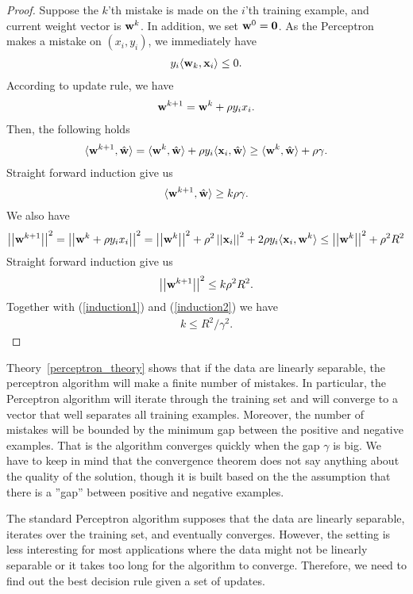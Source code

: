 \begin{proof}
	Suppose the $k$'th mistake is made on the $i$'th training example, and current weight vector is $\mathbf {w}^k$.
	In addition, we set $\mathbf {w}^0=\mathbf {0}$.
	As the Perceptron makes a mistake on $(x_i,y_i)$, we immediately have
	\begin{align*}
		y_i\langle \mathbf {w}_k, \mathbf {x}_i \rangle \le 0.
	\end{align*}
	According to update rule, we have
	\begin{align*}
		\mathbf {w}^{k+1} = \mathbf {w}^{k} + \rho y_ix_i.
	\end{align*}
	Then, the following holds
	\begin{align*}
		\langle \mathbf {w}^{k+1}, \hat{\mathbf {w}} \rangle = \langle \mathbf {w}^k, \hat{\mathbf {w}} \rangle + \rho y_i\langle \mathbf {x}_i, \hat{\mathbf {w}} \rangle \ge \langle \mathbf {w}^k, \hat{\mathbf {w}} \rangle + \rho\gamma.
	\end{align*}
	Straight forward induction give us
	\begin{align}
		\langle \mathbf {w}^{k+1}, \hat{\mathbf {w}} \rangle\ge k\rho\gamma. \label{induction1}
	\end{align}
	We also have
	\begin{align*}
		\left|\left| \mathbf {w}^{k+1} \right|\right|^2 
		= \left|\left| \mathbf {w}^{k} + \rho y_ix_i \right|\right|^2
		= \left|\left| \mathbf {w}^k \right|\right|^2 + \rho^2\left|\left| \mathbf {x}_i \right|\right|^2 + 2\rho y_i\langle \mathbf {x}_i, \mathbf {w}^k \rangle
		\le \left|\left| \mathbf {w}^k \right|\right|^2 + \rho^2R^2
	\end{align*}
	Straight forward induction give us
	\begin{align}
		\left|\left| \mathbf {w}^{k+1} \right|\right|^2\le k\rho^2R^2. \label{induction2}
	\end{align}
	Together with (\ref{induction1}) and (\ref{induction2}) we have
	\begin{align*}
		k\le{R^2}/{\gamma^2}.
	\end{align*}
\end{proof}
Theory~\ref{perceptron_theory} shows that if the data are linearly separable, the perceptron algorithm will make a finite number of mistakes. 
In particular, the Perceptron algorithm will iterate through the training set and will converge to a vector that well separates all training examples.
Moreover, the number of mistakes will be bounded by the minimum gap between the positive and negative examples.
That is the algorithm converges quickly when the gap $\gamma$ is big.
We have to keep in mind that the convergence theorem does not say anything about the quality of the solution, though it is built based on the the assumption that there is a ''gap'' between positive and negative examples.

The standard Perceptron algorithm supposes that the data are linearly separable, iterates over the training set, and eventually converges.
However, the setting is less interesting for most applications where the data might not be linearly separable or it takes too long for the algorithm to converge.
Therefore, we need to find out the best decision rule given a set of updates.

